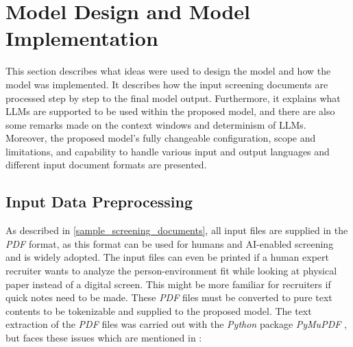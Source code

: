 \documentclass[draft,final]{thesisclass} %
\begin{document}
\section{Model Design and Model Implementation} \label{implementation}
This section describes what ideas were used to design the model and how the model was implemented.
It describes how the input screening documents are processed step by step to the final model output.
Furthermore, it explains what \gls{LLM}s are supported to be used within the proposed model, and there are also some remarks made on the context windows and determinism of \gls{LLM}s.
Moreover, the proposed model's fully changeable configuration, scope and limitations, and capability to handle various input and output languages and different input document formats are presented.

\subsection{Input Data Preprocessing}
As described in \ref{sample_screening_documents}, all input files are supplied in the \textit{PDF} format, as this format can be used for humans and \acs{AI}-enabled screening and is widely adopted.
The input files can even be printed if a human expert recruiter wants to analyze the person-environment fit while looking at physical paper instead of a digital screen.
This might be more familiar for recruiters if quick notes need to be made.
These \textit{PDF} files must be converted to pure text contents to be tokenizable and supplied to the proposed model.
The text extraction of the \textit{PDF} files was carried out with the \textit{Python} package \textit{PyMuPDF} \parencite{pymupdf}, but faces these issues which are mentioned in \textcite{pymupdf}:
\end{document}
